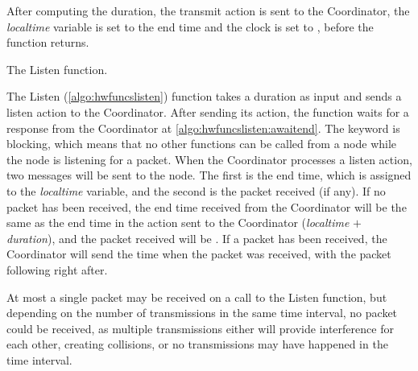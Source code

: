After computing the duration, the transmit action is sent to the Coordinator, the \textit{localtime} variable
is set to the end time and the clock is set to \KwNow, before the function returns. \medbreak

\begin{algorithm}[ht]
    \DontPrintSemicolon
    
    
    \caption{The Listen function.}
    \label{algo:hwfuncslisten}
\end{algorithm}

The Listen (\autoref{algo:hwfuncslisten}) function takes a duration as input and sends a listen action to the
Coordinator. After sending its action, the function waits for a response from the Coordinator at
\autoref{algo:hwfuncslisten:awaitend}. The \KwAwait keyword is blocking, which means that no other functions
can be called from a node while the node is listening for a packet. When the Coordinator processes a listen
action, two messages will be sent to the node. The first is the end time, which is assigned to the
\textit{localtime} variable, and the second is the packet received (if any). If no packet has been received,
the end time received from the Coordinator will be the same as the end time in the action sent to the
Coordinator (\textit{localtime} $+$ \textit{duration}), and the packet received will be \KwNull. If a packet
has been received, the Coordinator will send the time when the packet was received, with the packet following
right after.

At most a single packet may be received on a call to the Listen function, but depending on the number
of transmissions in the same time interval, no packet could be received, as multiple transmissions either will
provide interference for each other, creating collisions, or no transmissions may have happened in the time
interval.

